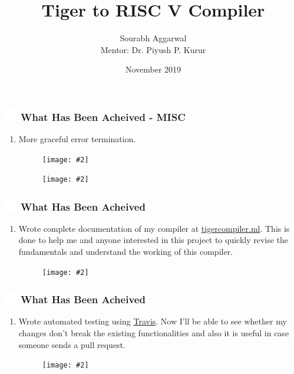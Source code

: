 \documentclass{beamer}
\title{Tiger to RISC V Compiler}
\author{Sourabh Aggarwal\\ Mentor: Dr. Piyush P. Kurur}
\institute[IIT Palakkad] %
{
  Department of Computer Science And Engineering\\
  IIT Palakkad
}
\date{November 2019}
\newcommand{\iph}[2]{
    \texttt{[image: \#2]}
}
\newcommand{\ft}[1]{
  \frametitle{\includegraphics[height=0.55cm, width=0.55cm, keepaspectratio]{assets/tiger.png} #1}
}
\newcounter{saveenumi}
\newcommand{\seti}{\setcounter{saveenumi}{\value{enumi}}}
\newcommand{\conti}{\setcounter{enumi}{\value{saveenumi}}}
\begin{document}
\begin{frame}
  \titlepage
\end{frame}

\begin{frame}[fragile]
  \ft{What Has Been Acheived - MISC}
  \begin{enumerate}
    \conti
    \item More graceful error termination.
    \begin{figure}
    \centering
    \iph{0.80}{assets/lexError.png}
    \label{fig:lexError}
    \end{figure}
    \begin{figure}
    \centering
    \iph{0.80}{assets/lexError3.png}
    \label{fig:lexError}
    \end{figure}
    \seti
  \end{enumerate}
\end{frame}

\begin{frame}[fragile]
  \ft{What Has Been Acheived}
  \begin{enumerate}
    \conti
    \item Wrote complete documentation of my compiler at \href{https://tigercompiler.ml}{tigercompiler.ml}. This is done to help me and anyone interested in this project to quickly revise the fundamentals and understand the working of this compiler.
    \begin{figure}
    \centering
    \iph{0.80}{assets/tigercompiler.png}
    \label{fig:tigercompiler}
    \end{figure}
    \seti
  \end{enumerate}
\end{frame}

\begin{frame}[fragile]
  \ft{What Has Been Acheived}
  \begin{enumerate}
    \conti
    \item Wrote automated testing using \href{https://travis-ci.org/sourabh2311/btp}{Travis}. Now I'll be able to see whether my changes don't break the existing functionalities and also it is useful in case someone sends a pull request.
    \begin{figure}
    \centering
    \iph{0.80}{assets/travis.png}
    \label{fig:travis}
    \end{figure}
    \seti
  \end{enumerate}
\end{frame}
\end{document}
